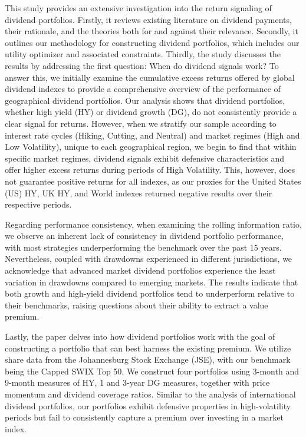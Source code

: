 \documentclass[11pt,preprint, authoryear]{elsarticle}
\numberwithin{equation}{section}
\numberwithin{figure}{section}
\numberwithin{table}{section}
\begin{document}
This study provides an extensive investigation into the return signaling
of dividend portfolios. Firstly, it reviews existing literature on
dividend payments, their rationale, and the theories both for and
against their relevance. Secondly, it outlines our methodology for
constructing dividend portfolios, which includes our utility optimizer
and associated constraints. Thirdly, the study discusses the results by
addressing the first question: When do dividend signals work? To answer
this, we initially examine the cumulative excess returns offered by
global dividend indexes to provide a comprehensive overview of the
performance of geographical dividend portfolios. Our analysis shows that
dividend portfolios, whether high yield (HY) or dividend growth (DG), do
not consistently provide a clear signal for returns. However, when we
stratify our sample according to interest rate cycles (Hiking, Cutting,
and Neutral) and market regimes (High and Low Volatility), unique to
each geographical region, we begin to find that within specific market
regimes, dividend signals exhibit defensive characteristics and offer
higher excess returns during periods of High Volatility. This, however,
does not guarantee positive returns for all indexes, as our proxies for
the United States (US) HY, UK HY, and World indexes returned negative
results over their respective periods.

Regarding performance consistency, when examining the rolling
information ratio, we observe an inherent lack of consistency in
dividend portfolio performance, with most strategies underperforming the
benchmark over the past 15 years. Nevertheless, coupled with drawdowns
experienced in different jurisdictions, we acknowledge that advanced
market dividend portfolios experience the least variation in drawdowns
compared to emerging markets. The results indicate that both growth and
high-yield dividend portfolios tend to underperform relative to their
benchmarks, raising questions about their ability to extract a value
premium.

Lastly, the paper delves into how dividend portfolios work with the goal
of constructing a portfolio that can best harness the existing premium.
We utilize share data from the Johannesburg Stock Exchange (JSE), with
our benchmark being the Capped SWIX Top 50. We construct four portfolios
using 3-month and 9-month measures of HY, 1 and 3-year DG measures,
together with price momentum and dividend coverage ratios. Similar to
the analysis of international dividend portfolios, our portfolios
exhibit defensive properties in high-volatility periods but fail to
consistently capture a premium over investing in a market index.
\newpage
\end{document}
